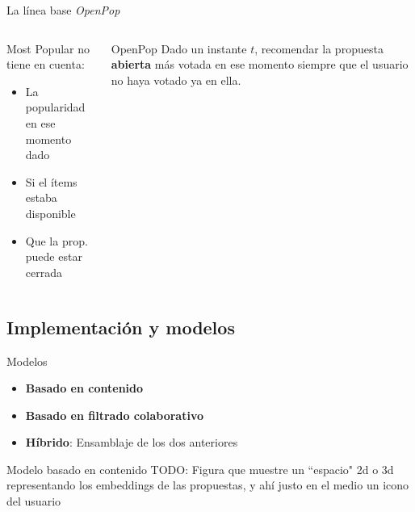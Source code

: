 \begin{frame}{La línea base \textit{OpenPop}}
\begin{columns}
    \begin{alertblock}{Most Popular no tiene en cuenta:}
    \begin{itemize}
        \item La popularidad en ese momento dado
        \item Si el ítems estaba disponible
        \item Que la prop. puede estar cerrada
    \end{itemize}
    \end{alertblock}
    \pause
    \begin{exampleblock}{OpenPop}
        Dado un instante $t$, recomendar la propuesta \textbf{abierta} más votada en ese momento siempre que el usuario no haya votado ya en ella.
    \end{exampleblock}
\end{columns}

\end{frame}

\subsection{Implementación y modelos}

\begin{frame}{Modelos}
\begin{itemize}
    \item<1-> \textbf{Basado en contenido}
    \item<2-> \textbf{Basado en filtrado colaborativo}
    \item<4-> \textbf{Híbrido}: Ensamblaje de los dos anteriores
\end{itemize}
\end{frame}

\begin{frame}{Modelo basado en contenido}
    TODO: Figura que muestre un ``espacio" 2d o 3d representando los embeddings de las propuestas, y ahí justo en el medio un icono del usuario
\end{frame}

